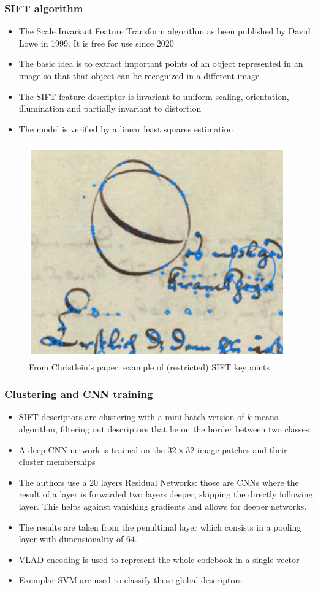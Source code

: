\documentclass{beamer}
\begin{document}
\begin{frame}
	\frametitle{SIFT algorithm}
	\begin{itemize}
	\item 	The Scale Invariant Feature Transform algorithm as been published by David Lowe in 1999. It is free for use since 2020
	\item The basic idea is to extract important points of an object represented in an image so that that object can be recognized in a different image
	\item The SIFT feature descriptor is invariant to uniform scaling, orientation, illumination and partially invariant to distortion
	\item The model is verified by a linear least squares estimation
	\end{itemize} 
	\begin{figure}[h]
		\centering
		\includegraphics[width=0.3\linewidth]{img/screenshot001}
		\caption{From Christlein's paper: example of (restricted) SIFT keypoints}
		\label{fig:screenshot001}
	\end{figure}
\end{frame}
\begin{frame}
	\frametitle{Clustering and CNN training}
	\begin{itemize}
		\item SIFT descriptors are clustering with a mini-batch version of $k$-means algorithm, filtering out descriptors that lie on the border between two classes
	\item A deep CNN network is trained on the $32\times 32$ image patches and their cluster memberships
	\item The authors use a 20 layers Residual Networks: those are CNNs where the result of a layer is forwarded two layers deeper, skipping the directly following layer. This helps against vanishing gradients and allows for deeper networks.
	\item The results are taken from the penultimal layer which consists in a pooling layer with dimensionality of $64$.
	\item VLAD encoding is used to represent the whole codebook in a single vector
	\item Exemplar SVM are used to classify these global descriptors.
	\end{itemize}
\end{frame}
\end{document}
